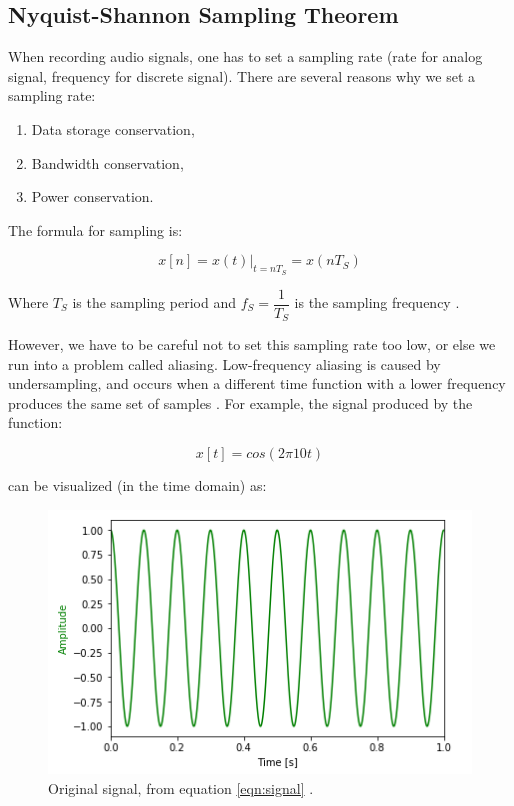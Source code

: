 \subsection{Nyquist-Shannon Sampling Theorem}

When recording audio signals, one has to set a sampling rate
(rate for analog signal, frequency for discrete signal). There
are several reasons why we set a sampling rate:

\begin{enumerate}
	\item Data storage conservation,
	\item Bandwidth conservation,
	\item Power conservation.
\end{enumerate}

The formula for sampling is:

\begin{equation}
	x[n]=x(t)|_{t=nT_{S}}=x(nT_{S})
	\label{eqn:signal}
\end{equation}

Where \(T_{S}\) is the sampling period and \(f_{S}=
\dfrac{1}{T_{S}}\) is the sampling frequency 
\cite{notes:class}.

However, we have to be careful not to set this sampling rate too
low, or else we run into a problem called aliasing. Low-frequency
aliasing is caused by undersampling, and occurs when a different
time function with a lower frequency produces the same set of
samples \cite{aliase:wiki}. For example, the signal produced by
the function:

\begin{equation}
	x[t]=cos(2\pi10t)
\end{equation}

can be visualized (in the time domain) as:

\begin{figure}[H]
	\centering
	\includegraphics[scale = 1]{original_signal.png} %
	\caption{Original signal, from equation \ref{eqn:signal} \cite{notebook:sampling}.}
	\label{fig:signal_og}
\end{figure}    

